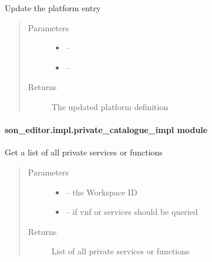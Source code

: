 \documentclass[letterpaper,10pt,english]{sphinxmanual}
\begin{document}
\begin{fulllineitems}
\label{_source/son_editor.impl:son_editor.impl.platformsimpl.update_platform}
Update the platform entry
\begin{quote}\begin{description}
\item[{Parameters}] \leavevmode\begin{itemize}
\item {} 
 -- 

\item {} 
 -- 

\end{itemize}

\item[{Returns}] \leavevmode
The updated platform definition

\end{description}\end{quote}

\end{fulllineitems}



\paragraph{son\_editor.impl.private\_catalogue\_impl module}
\label{_source/son_editor.impl:son-editor-impl-private-catalogue-impl-module}\label{_source/son_editor.impl:module-son_editor.impl.private_catalogue_impl}

\begin{fulllineitems}
\label{_source/son_editor.impl:son_editor.impl.private_catalogue_impl.get_private_nsfs_list}
Get a list of all private services or functions
\begin{quote}\begin{description}
\item[{Parameters}] \leavevmode\begin{itemize}
\item {} 
 -- the Workspace ID

\item {} 
 -- if vnf or services should be queried

\end{itemize}

\item[{Returns}] \leavevmode
List of all private services or functions

\end{description}\end{quote}

\end{fulllineitems}
\end{document}
